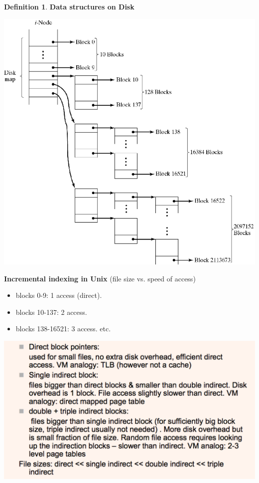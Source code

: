\documentclass[11pt,a4paper]{article}
\theoremstyle{definition}
\newtheorem{definition}{Definition}[section]
\newenvironment{myitemize}
{ \begin{itemize}
    \setlength{\itemsep}{5pt}
    \setlength{\parskip}{0pt}
    \setlength{\parsep}{0pt}     }
{ \end{itemize}                  }
\newenvironment{myenumerate}
{ \begin{enumerate}
    \setlength{\itemsep}{5pt}
    \setlength{\parskip}{0pt}
    \setlength{\parsep}{0pt}     }
{ \end{enumerate}                }
\begin{document}
\begin{definition}{\textbf{Data structures on Disk}}
\begin{myitemize}
\begin{myenumerate}
			\begin{minipage}{0.5\linewidth}
				\includegraphics[width=1.0\linewidth]{m2/systemVFileSystem3}
			\end{minipage}
			\begin{minipage}{0.5\linewidth}
				\textbf{Incremental indexing in Unix} (file size vs. speed of access)
				\begin{myitemize}
					\item blocks 0-9: 1 access (direct).
					\item blocks 10-137: 2 access.
					\item blocks 138-16521: 3 access. etc.
				\end{myitemize}
				
				\includegraphics[width=1.0\linewidth]{m2/systemVFileSystem4}
			\end{minipage}
			

\end{myenumerate}
\end{myitemize}
\end{definition}
\end{document}
